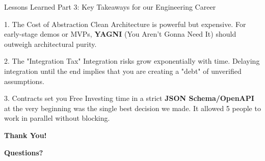 \documentclass[aspectratio=169, 10pt, xcolor=table]{beamer}
\begin{document}
\begin{frame}{Lessons Learned}
    {Part 3: Key Takeaways for our Engineering Career}
    \footnotesize
    \pause
    \begin{block}{1. The Cost of Abstraction}
        Clean Architecture is powerful but expensive. For early-stage demos or MVPs, \textbf{YAGNI} (You Aren't Gonna Need It) should outweigh architectural purity.
    \end{block}

    \vspace{0.5em}
    \pause

    \begin{block}{2. The "Integration Tax"}
        Integration risks grow exponentially with time. Delaying integration until the end implies that you are creating a "debt" of unverified assumptions.
    \end{block}

    \vspace{0.5em}
    \pause

    \begin{block}{3. Contracts set you Free}
        Investing time in a strict \textbf{JSON Schema/OpenAPI} at the very beginning was the single best decision we made. It allowed 5
         people to work in parallel without blocking.
    \end{block}
\end{frame}

\begin{frame}
    \centering
    \Huge \color{FUblue} \textbf{Thank You!}
    
    \vspace{1cm}
    \normalsize
    \textbf{Questions?}
    
    \vspace{2cm}

\end{frame}
\end{document}
